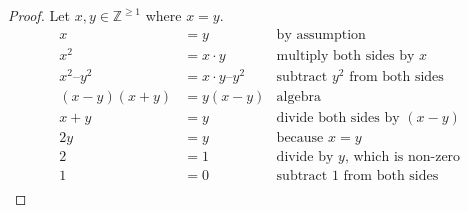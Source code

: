 \documentclass[11pt, oneside]{article}   	%
\newcommand{\ints}{\mathbb{Z}}
\begin{document}
\begin{enumerate}
\begin{proof}
Let $x, y \in \ints^{\ge1}$ where $x=y$.
\[
\begin{aligned}
x &= y & \text{by assumption}\\
x^2 &= x\cdot y & \text{multiply both sides by $x$}\\
x^2 – y^2 &= x\cdot y – y^2 & \text{subtract $y^2$ from both sides}\\ 
\left(x-y\right)\left(x+y\right) &= y \left(x-y\right) & \text{algebra}\\
x + y &= y & \text{divide both sides by $(x-y)$}\\
2 y &= y & \text{because $x=y$}\\
2 &= 1 & \text{divide by $y$, which is non-zero}\\
1 &= 0 & \text{subtract 1 from both sides}\\
\end{aligned}
\]
\end{proof}
\vspace{5em}

\end{enumerate}
\end{document}
